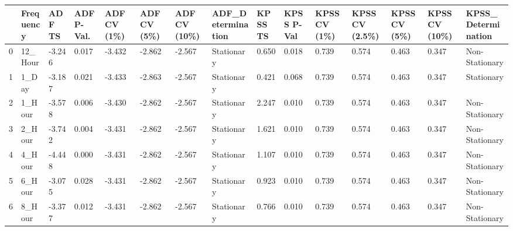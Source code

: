 \begin{tabular}{lllllllllllllll}
\toprule
 & Frequency & ADF TS & ADF P-Val. & ADF CV (1\%) & ADF CV (5\%) & ADF CV (10\%) & ADF_Determination & KPSS TS & KPSS P-Val & KPSS CV (1\%) & KPSS CV (2.5\%) & KPSS CV (5\%) & KPSS CV (10\%) & KPSS_Determination \\
\midrule
0 & 12_Hour & -3.246 & 0.017 & -3.432 & -2.862 & -2.567 & Stationary & 0.650 & 0.018 & 0.739 & 0.574 & 0.463 & 0.347 & Non-Stationary \\
1 & 1_Day & -3.187 & 0.021 & -3.433 & -2.863 & -2.567 & Stationary & 0.421 & 0.068 & 0.739 & 0.574 & 0.463 & 0.347 & Stationary \\
2 & 1_Hour & -3.578 & 0.006 & -3.430 & -2.862 & -2.567 & Stationary & 2.247 & 0.010 & 0.739 & 0.574 & 0.463 & 0.347 & Non-Stationary \\
3 & 2_Hour & -3.742 & 0.004 & -3.431 & -2.862 & -2.567 & Stationary & 1.621 & 0.010 & 0.739 & 0.574 & 0.463 & 0.347 & Non-Stationary \\
4 & 4_Hour & -4.448 & 0.000 & -3.431 & -2.862 & -2.567 & Stationary & 1.107 & 0.010 & 0.739 & 0.574 & 0.463 & 0.347 & Non-Stationary \\
5 & 6_Hour & -3.075 & 0.028 & -3.431 & -2.862 & -2.567 & Stationary & 0.923 & 0.010 & 0.739 & 0.574 & 0.463 & 0.347 & Non-Stationary \\
6 & 8_Hour & -3.377 & 0.012 & -3.431 & -2.862 & -2.567 & Stationary & 0.766 & 0.010 & 0.739 & 0.574 & 0.463 & 0.347 & Non-Stationary \\
\bottomrule
\end{tabular}
